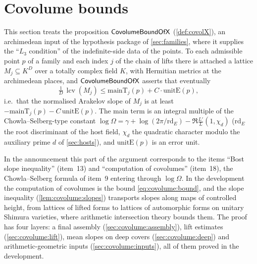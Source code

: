 \section{Covolume bounds}\label{sec:covolume}

\providecommand{\covolumelcv}{\operatorname{lcv}}
\providecommand{\covolumerk}{\operatorname{rk}}
\providecommand{\covolumemainT}{\mathrm{mainT}}
\providecommand{\covolumeunitE}{\mathrm{unitE}}
\providecommand{\covolumeII}{\mathrm{II}}
\providecommand{\covolumehdeg}{\widehat{\operatorname{deg}}}
\providecommand{\covolumehvol}{\widehat{\operatorname{vol}}}
\providecommand{\covolumeLat}[1]{\Lambda^{\mathrm{#1}}}

This section treats the proposition $\mathsf{CovolumeBoundOfX}$ (\cref{def:covolX}), an archimedean
input of the hypothesis package of \cref{sec:families}, where it supplies the ``$L_3$ condition'' of the
indefinite-side data of the points. To each admissible point $p$ of a family and each index $j$ of the
chain of lifts there is attached a lattice $M_j\subseteq K^D$ over a totally complex field $K$, with
Hermitian metrics at the archimedean places, and $\mathsf{CovolumeBoundOfX}$ asserts that eventually
\begin{equation}\label{eq:covolume:bound}
\tfrac1D\,\covolumelcv(M_j)\le\covolumemainT_j(p)+C\cdot\covolumeunitE(p),
\end{equation}
i.e.\ that the normalised Arakelov slope of $M_j$ is at least $-\covolumemainT_j(p)-C\,\covolumeunitE(p)$.
The main term is an integral multiple of the Chowla--Selberg-type constant
$\log\Omega=\gamma+\log(2\pi/\mathrm{rd}_E)-\Re\frac{L'}{L}(1,\chi_d)$ ($\mathrm{rd}_E$ the root discriminant
of the host field, $\chi_d$ the quadratic character modulo the auxiliary prime $d$ of \cref{sec:hosts}),
and $\covolumeunitE(p)$ is an error unit.

In the announcement \cite{Announcement2026} this part of the argument corresponds to the items ``Bost
slope inequality'' (item~13) and ``computation of covolumes'' (item~18), the Chowla--Selberg formula of
item~9 entering through $\log\Omega$. In the development the computation of covolumes is the bound
\eqref{eq:covolume:bound}, and the slope inequality (\cref{lem:covolume:slopes}) transports slopes along
maps of controlled height, from lattices of lifted forms to lattices of automorphic forms on unitary
Shimura varieties, where arithmetic intersection theory bounds them. The proof has four layers: a final
assembly (\cref{sec:covolume:assembly}), lift estimates (\cref{sec:covolume:lift}), mean slopes on deep
covers (\cref{sec:covolume:deep}) and arithmetic-geometric inputs (\cref{sec:covolume:inputs}), all of
them proved in the development.

